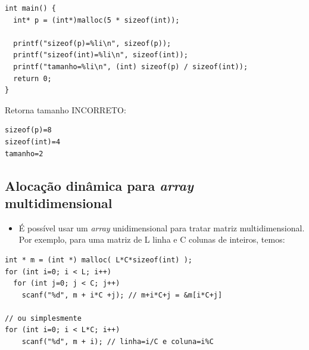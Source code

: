 \documentclass[12pt,a4paper]{article}
\providecommand{\tightlist}{%
      \setlength{\itemsep}{0pt}\setlength{\parskip}{0pt}}
\begin{document}
\begin{verbatim}
int main() {
  int* p = (int*)malloc(5 * sizeof(int));

  printf("sizeof(p)=%li\n", sizeof(p));
  printf("sizeof(int)=%li\n", sizeof(int));
  printf("tamanho=%li\n", (int) sizeof(p) / sizeof(int));
  return 0;
}
\end{verbatim}

Retorna tamanho INCORRETO:

\begin{verbatim}
sizeof(p)=8
sizeof(int)=4
tamanho=2
\end{verbatim}

    \hypertarget{alocauxe7uxe3o-dinuxe2mica-para-array-multidimensional}{%
\subsection{\texorpdfstring{Alocação dinâmica para \emph{array}
multidimensional}{Alocação dinâmica para array multidimensional}}\label{alocauxe7uxe3o-dinuxe2mica-para-array-multidimensional}}

    \begin{itemize}
\tightlist
\item
  É possível usar um \emph{array} unidimensional para tratar matriz
  multidimensional. Por exemplo, para uma matriz de L linha e C colunas
  de inteiros, temos:
\end{itemize}

\begin{verbatim}
int * m = (int *) malloc( L*C*sizeof(int) );
for (int i=0; i < L; i++)
  for (int j=0; j < C; j++)
    scanf("%d", m + i*C +j); // m+i*C+j = &m[i*C+j]

// ou simplesmente
for (int i=0; i < L*C; i++)
    scanf("%d", m + i); // linha=i/C e coluna=i%C
\end{verbatim}
\end{document}
